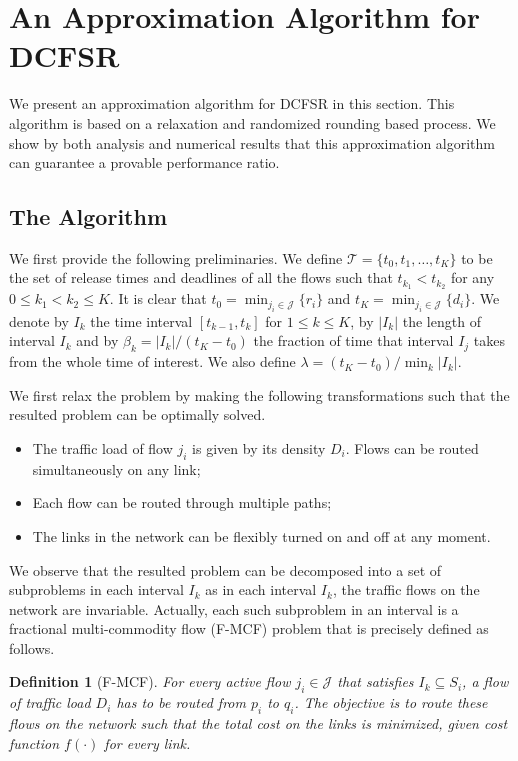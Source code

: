 \documentclass[10pt, conference, compsocconf]{IEEEtran}
\newtheorem{definition}{Definition}
\begin{document}
\section{An Approximation Algorithm for DCFSR}
\label{sec:approx}

We present an approximation algorithm for DCFSR in this section. This algorithm is based on a relaxation and randomized rounding based process. We show by both analysis and numerical results that this approximation algorithm can guarantee a provable performance ratio.

\subsection{The Algorithm}

We first provide the following preliminaries. We define $\mathcal{T} = \{t_0, t_1,\ldots,t_K\}$ to be the set of release times and deadlines of all the flows such that $t_{k_1} < t_{k_2}$ for any $0 \leq k_1 < k_2 \leq K$. It is clear that $t_0 = \min_{j_i \in \mathcal{J}} \{r_i\}$ and $t_K = \min_{j_i \in \mathcal{J}} \{d_i\}$. We denote by $I_k$ the time interval $[t_{k-1},t_k]$ for $1\leq k \leq K$, by $|I_k|$ the length of interval $I_k$ and by $\beta_k = |I_k|/(t_K-t_0)$ the fraction of time that interval $I_j$ takes from the whole time of interest. We also define $\lambda = (t_K-t_0)/\min_{k}|I_k|$.

We first relax the problem by making the following transformations such that the resulted problem can be optimally solved.
\begin{itemize}
\item The traffic load of flow $j_i$ is given by its density $D_i$. Flows can be routed simultaneously on any link;
\item Each flow can be routed through multiple paths;
\item The links in the network can be flexibly turned on and off at any moment.
\end{itemize}
We observe that the resulted problem can be decomposed into a set of subproblems in each interval $I_k$ as in each interval $I_k$, the traffic flows on the network are invariable. Actually, each such subproblem in an interval is a fractional multi-commodity flow (F-MCF) problem that is precisely defined as follows.
\begin{definition}[F-MCF]
For every active flow $j_i \in \mathcal{J}$ that satisfies $I_k \subseteq S_i$, a flow of traffic load $D_i$ has to be routed from $p_i$ to $q_i$. The objective is to route these flows on the network such that the total cost on the links is minimized, given cost function $f(\cdot)$ for every link.
\end{definition}
\end{document}
